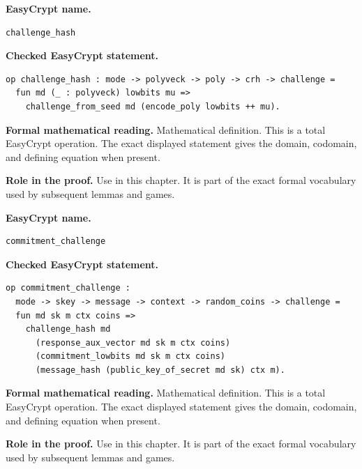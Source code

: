 \begin{formaldefinition}
\noindent\textbf{EasyCrypt name.}
\begin{lstlisting}[language=EasyCrypt,basicstyle=\ttfamily\scriptsize]
challenge_hash
\end{lstlisting}
\noindent\textbf{Checked EasyCrypt statement.}
\begin{lstlisting}[language=EasyCrypt,basicstyle=\ttfamily\scriptsize]
op challenge_hash : mode -> polyveck -> poly -> crh -> challenge =
  fun md (_ : polyveck) lowbits mu =>
    challenge_from_seed md (encode_poly lowbits ++ mu).
\end{lstlisting}
\noindent\textbf{Formal mathematical reading.}
Mathematical definition. This is a total EasyCrypt operation.  The exact displayed statement gives the domain, codomain, and defining equation when present.

\noindent\textbf{Role in the proof.}
Use in this chapter. It is part of the exact formal vocabulary used by subsequent lemmas and games.

\end{formaldefinition}

\begin{formaldefinition}
\noindent\textbf{EasyCrypt name.}
\begin{lstlisting}[language=EasyCrypt,basicstyle=\ttfamily\scriptsize]
commitment_challenge
\end{lstlisting}
\noindent\textbf{Checked EasyCrypt statement.}
\begin{lstlisting}[language=EasyCrypt,basicstyle=\ttfamily\scriptsize]
op commitment_challenge :
  mode -> skey -> message -> context -> random_coins -> challenge =
  fun md sk m ctx coins =>
    challenge_hash md
      (response_aux_vector md sk m ctx coins)
      (commitment_lowbits md sk m ctx coins)
      (message_hash (public_key_of_secret md sk) ctx m).
\end{lstlisting}
\noindent\textbf{Formal mathematical reading.}
Mathematical definition. This is a total EasyCrypt operation.  The exact displayed statement gives the domain, codomain, and defining equation when present.

\noindent\textbf{Role in the proof.}
Use in this chapter. It is part of the exact formal vocabulary used by subsequent lemmas and games.

\end{formaldefinition}

